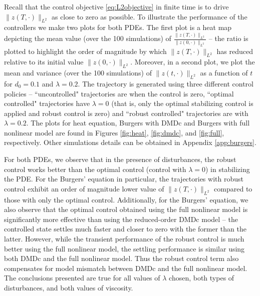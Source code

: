 \documentclass[10pt,a4paper]{amsart}
\newcommand{\todo}[1]{{\color{blue} #1}}
\begin{document}
Recall that the control objective \eqref{eq:L2objective} in finite time is to drive $\|z(T,\cdot)\|_{L^2}$  as close to zero as possible. To illustrate the performance of the controllers we make two plots for both PDEs. 
The first plot is a heat map depicting the mean value (over the 100 simulations) of $\frac{\|z(T,\cdot)\|_{L^2}}{\|z(0,\cdot)\|_{L^2}}$ -- the ratio is plotted to highlight the order of magnitude by which $\|z(T,\cdot)\|_{L^2}$  has reduced relative to its initial value $\|z(0,\cdot)\|_{L^2}$. 
Moreover, in a second plot, we plot the mean and variance (over the 100 simulations) of  $\|z(t,\cdot)\|_{L^2}$ as a function of $t$ for $d_0 = 0.1$ and $\lambda = 0.2$. The trajectory is generated using three different control policies -- ``uncontrolled" trajectories are when the control is zero, ``optimal controlled" trajectories have $\lambda = 0$ (that is, only the optimal stabilizing control is applied and robust control is zero) and ``robust controlled" trajectories are with $\lambda = 0.2$. The plots for heat equation, Burgers with DMDc and Burgers with full nonlinear model are found in Figures \ref{fig:heat}, \ref{fig:dmdc}, and \ref{fig:full}, respectively. Other simulations details can be obtained in Appendix \ref{app:burgers}. 

For both PDEs, we observe that in the presence of disturbances, the robust control works better than the optimal control (control with $\lambda = 0$) in stabilizing the PDE. For the Burgers' equation in particular, the trajectories with robust control exhibit an order of magnitude lower value of $\|z(T,\cdot)\|_{L^2}$ compared to those with only the optimal control. Additionally, for the Burgers' equation, we also observe that the optimal control obtained using the full nonlinear model is significantly more effective than using the reduced-order DMDc model -- the controlled state settles much faster and closer to zero with the former than the latter. However, while the transient performance of the robust control is much better using the full nonlinear model, the settling performance is similar using both DMDc and the full nonlinear model. Thus the robust control term also compensates for model mismatch between DMDc and the full nonlinear model. The conclusions presented are true for all values of $\lambda$ chosen, both types of disturbances, and both values of viscosity. 
\end{document}
